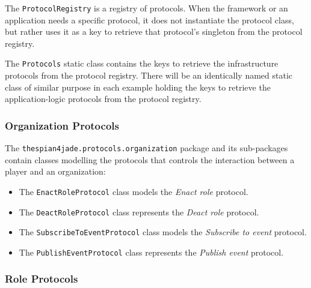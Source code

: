 The \texttt{ProtocolRegistry} is a registry of protocols.
When the framework or an application needs a specific protocol, it does not instantiate the protocol class, but rather uses it as a key to retrieve that protocol's singleton from the protocol registry. 

The \texttt{Protocols} static class contains the keys to retrieve the infrastructure protocols from the protocol registry.
There will be an identically named static class of similar purpose in each example holding the keys to retrieve the application-logic protocols from the protocol registry. 

\subsubsection{Organization Protocols}

The \texttt{thespian4jade.protocols.organization} package and its sub-packages contain classes modelling the protocols that controls the interaction between a player and an organization:
\begin{itemize}
	\item The \texttt{EnactRoleProtocol} class models the \textit{Enact role} protocol.
	\item The \texttt{DeactRoleProtocol} class represents the \textit{Deact role} protocol.
	\item The \texttt{SubscribeToEventProtocol} class models the \textit{Subscribe to event} protocol.
	\item The \texttt{PublishEventProtocol} class represents the \textit{Publish event} protocol.
\end{itemize}

\subsubsection{Role Protocols}

